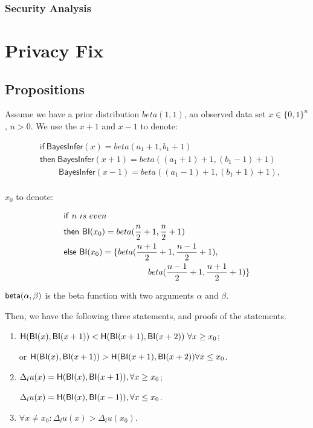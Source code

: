 \subsubsection{Security Analysis}


\section{Privacy Fix}

\subsection{Propositions}
Assume we have a prior distribution $beta(1,1)$, an observed data set $x \in \{0,1\}^n$, $n>0$. We use the $x+1$ and $x-1$ to denote:
\begin{small}
\begin{equation*}
\begin{split}
&\mathsf{if\ BayesInfer}(x) = beta(a_1 + 1,b_1 + 1)\\
&\mathsf{then}\mathsf{\ BayesInfer}(x + 1) = beta((a_1 + 1) +1, (b_1 - 1)+1)\\
&\quad \quad \mathsf{\ BayesInfer}(x - 1) = beta((a_1 - 1) +1, (b_1 + 1)+1),\\
\end{split}
\end{equation*}
\end{small}

$x_0$ to denote:
\begin{small}
\begin{equation*}
\begin{split}
&\mathsf{if}\ n\ is\ even\\
&\mathsf{then}\ \mathsf{BI}(x_0) = beta(\frac{n}{2} + 1, \frac{n}{2} + 1)\\
&\mathsf{else}\ \mathsf{BI}(x_0) = \{beta(\frac{n+1}{2} + 1, \frac{n-1}{2} + 1),\\
&\quad \quad \quad \quad \quad \quad \quad \quad \quad \quad beta(\frac{n - 1}{2} + 1, \frac{n + 1}{2} + 1)\}
\end{split}
\end{equation*}
\end{small}

$\mathsf{beta}(\alpha, \beta)$ is the beta function with two arguments $\alpha$ and $\beta$.

Then, we have the following three statements, and proofs of the statements.
\renewcommand{\labelenumi}{\Roman{enumi}}
\begin{enumerate}
\item $\mathsf{H} (\mathsf{BI}(x), \mathsf{BI}(x + 1)) < \mathsf{H} (\mathsf{BI}(x + 1), \mathsf{BI}(x + 2))\ \forall x \geq x_0$;

or $\mathsf{H} (\mathsf{BI}(x), \mathsf{BI}(x + 1)) > \mathsf{H} (\mathsf{BI}(x + 1), \mathsf{BI}(x + 2))\forall x \leq x_0$.

\item $\Delta_{l}u(x) = \mathsf{H} (\mathsf{BI}(x),\mathsf{BI}(x + 1)),\forall x \geq x_0$;

$\Delta_{l}u(x) = \mathsf{H} (\mathsf{BI}(x),\mathsf{BI}(x - 1)),\forall x \leq x_0$.

\item $\forall x \neq x_0: \Delta_{l}u(x) > \Delta_{l}u(x_0)$.
\end{enumerate}

